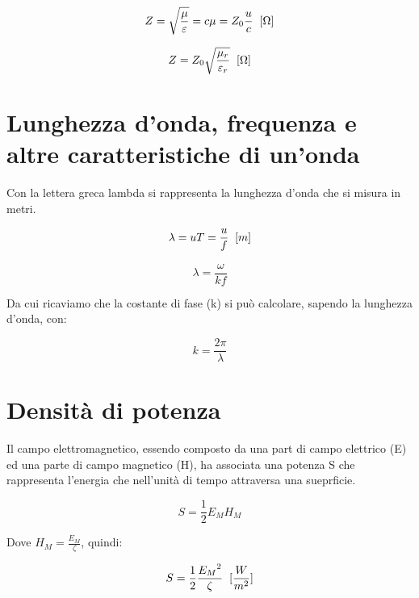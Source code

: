 \documentclass{article}
\begin{document}
    \begin{equation}
        Z = \sqrt{\frac{\mu}{\varepsilon}} = c \mu = Z_0 \frac{u}{c} \hspace{0.2cm} [\Omega]
    \end{equation}

    \begin{equation}
        Z = Z_0 \sqrt{\frac{\mu_r}{\varepsilon_r}} \hspace{0.2cm} [\Omega]
    \end{equation}

    \section{Lunghezza d'onda, frequenza e altre caratteristiche di un'onda}

    Con la lettera greca lambda si rappresenta la lunghezza d'onda che si misura in metri.

    \begin{equation}
        \lambda = u T = \frac{u}{f} \hspace{0.2cm} [m]
    \end{equation}

    \begin{equation}
        \lambda = \frac{\omega}{k f}
    \end{equation}

    Da cui ricaviamo che la costante di fase (k) si può calcolare, sapendo la lunghezza d'onda, con:

    \begin{equation}
        k = \frac{2 \pi}{\lambda}
    \end{equation}

    \section{Densità di potenza}
    
    Il campo elettromagnetico, essendo composto da una part di campo elettrico (E) ed una parte di campo magnetico
    (H), ha associata una potenza S che rappresenta l'energia che nell'unità di tempo attraversa una sueprficie.

    \begin{equation}
        S = \frac{1}{2} E_M H_M
    \end{equation}

    Dove $H_M = \frac{E_M}{\zeta}$, quindi:

    \begin{equation}
        S = \frac{1}{2} \frac{{E_M}^2}{\zeta} \hspace{0.2cm} [\frac{W}{m^2}]
    \end{equation}
\end{document}
